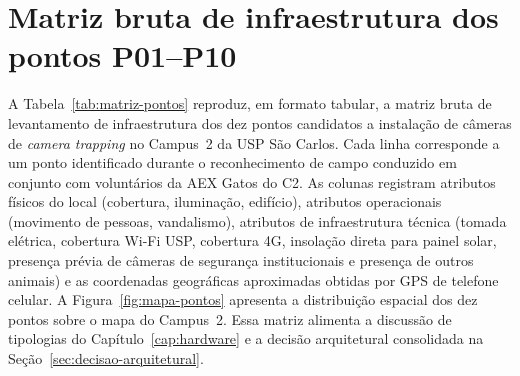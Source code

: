 
\chapter{Matriz bruta de infraestrutura dos pontos P01--P10}
\label{ap:matriz-pontos}

A Tabela~\ref{tab:matriz-pontos} reproduz, em formato tabular, a matriz bruta de levantamento de infraestrutura dos dez pontos candidatos a instalação de câmeras de \textit{camera trapping} no Campus~2 da USP São Carlos. Cada linha corresponde a um ponto identificado durante o reconhecimento de campo conduzido em conjunto com voluntários da AEX Gatos do C2. As colunas registram atributos físicos do local (cobertura, iluminação, edifício), atributos operacionais (movimento de pessoas, vandalismo), atributos de infraestrutura técnica (tomada elétrica, cobertura Wi-Fi USP, cobertura 4G, insolação direta para painel solar, presença prévia de câmeras de segurança institucionais e presença de outros animais) e as coordenadas geográficas aproximadas obtidas por GPS de telefone celular. A Figura~\ref{fig:mapa-pontos} apresenta a distribuição espacial dos dez pontos sobre o mapa do Campus~2. Essa matriz alimenta a discussão de tipologias do Capítulo~\ref{cap:hardware} e a decisão arquitetural consolidada na Seção~\ref{sec:decisao-arquitetural}.

